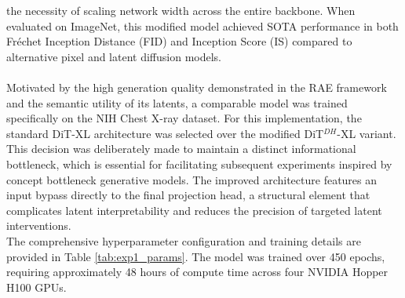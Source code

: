 the necessity of scaling network width across the entire backbone. When evaluated on ImageNet, this modified model achieved SOTA 
performance in both Fréchet Inception Distance (FID) and Inception Score (IS) compared to alternative pixel and latent diffusion 
models. \\
\\
Motivated by the high generation quality demonstrated in the RAE framework and the semantic utility of its latents, a comparable 
model was trained specifically on the NIH Chest X-ray dataset. For this implementation, the standard DiT-XL architecture 
was selected over the modified DiT$^{DH}$-XL variant. This decision was deliberately made to maintain a distinct informational bottleneck, 
which is essential for facilitating subsequent experiments inspired by concept bottleneck generative models. The improved architecture 
features an input bypass directly to the final projection head, a structural element that complicates latent interpretability and 
reduces the precision of targeted latent interventions. \\
The comprehensive hyperparameter configuration and training details are provided in Table \ref{tab:exp1_params}. The model was trained 
over 450 epochs, requiring approximately 48 hours of compute time across four NVIDIA Hopper H100 GPUs.\\

